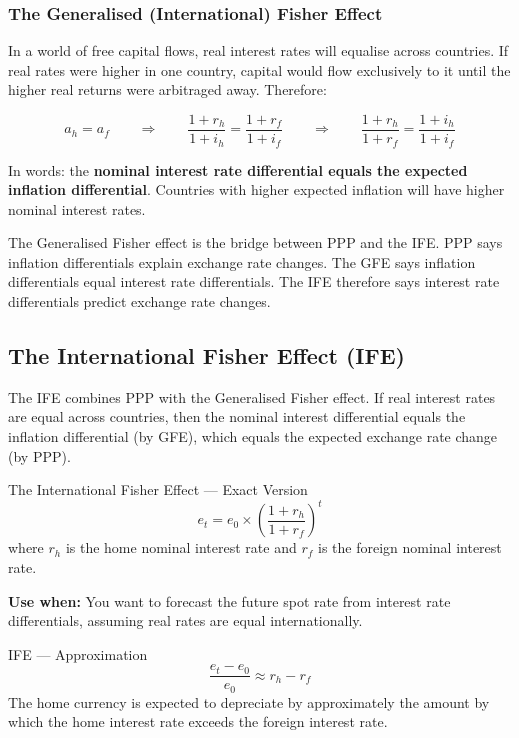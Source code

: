 \documentclass[11pt,a4paper]{article}
\begin{document}
\subsubsection{The Generalised (International) Fisher Effect}

In a world of free capital flows, real interest rates will equalise across countries. If real rates were higher in one country, capital would flow exclusively to it until the higher real returns were arbitraged away. Therefore:

\[
  a_h = a_f \qquad \Longrightarrow \qquad \frac{1 + r_h}{1 + i_h} = \frac{1 + r_f}{1 + i_f} \qquad \Longrightarrow \qquad \frac{1 + r_h}{1 + r_f} = \frac{1 + i_h}{1 + i_f}
\]

In words: the \textbf{nominal interest rate differential equals the expected inflation differential}. Countries with higher expected inflation will have higher nominal interest rates.

\begin{tipbox}
The Generalised Fisher effect is the bridge between PPP and the IFE. PPP says inflation differentials explain exchange rate changes. The GFE says inflation differentials equal interest rate differentials. The IFE therefore says interest rate differentials predict exchange rate changes.
\end{tipbox}

\subsection{The International Fisher Effect (IFE)}

The IFE combines PPP with the Generalised Fisher effect. If real interest rates are equal across countries, then the nominal interest differential equals the inflation differential (by GFE), which equals the expected exchange rate change (by PPP).

\begin{formulabox}{The International Fisher Effect --- Exact Version}
\[
  e_t = e_0 \times \left(\frac{1 + r_h}{1 + r_f}\right)^t
\]
where $r_h$ is the home nominal interest rate and $r_f$ is the foreign nominal interest rate.

\textbf{Use when:} You want to forecast the future spot rate from interest rate differentials, assuming real rates are equal internationally.
\end{formulabox}

\begin{formulabox}{IFE --- Approximation}
\[
  \frac{e_t - e_0}{e_0} \approx r_h - r_f
\]
The home currency is expected to depreciate by approximately the amount by which the home interest rate exceeds the foreign interest rate.
\end{formulabox}
\end{document}
